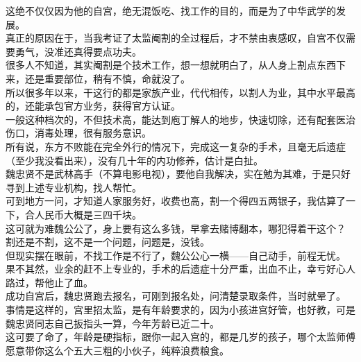 \begin{multicols}{\theparacolNo}
这绝不仅仅因为他的自宫，绝无混饭吃、找工作的目的，而是为了中华武学的发展。\\

真正的原因在于，当我考证了太监阉割的全过程后，才不禁由衷感叹，自宫不仅需要勇气，没准还真得要点功夫。\\

很多人不知道，其实阉割是个技术工作，想一想就明白了，从人身上割点东西下来，还是重要部位，稍有不慎，命就没了。\\

所以很多年以来，干这行的都是家族产业，代代相传，以割人为业，其中水平最高的，还能承包官方业务，获得官方认证。\\

一般这种档次的，不但技术高，能达到庖丁解人的地步，快速切除，还有配套医治伤口，消毒处理，很有服务意识。\\

所有说，东方不败能在完全外行的情况下，完成这一复杂的手术，且毫无后遗症（至少我没看出来），没有几十年的内功修养，估计是白扯。\\

魏忠贤不是武林高手（不算电影电视），要他自我解决，实在勉为其难，于是只好寻到上述专业机构，找人帮忙。\\

可到地方一问，才知道人家服务好，收费也高，割一个得四五两银子，我估算了一下，合人民币大概是三四千块。\\

这可就为难魏公公了，身上要有这么多钱，早拿去赌博翻本，哪犯得着干这个？\\

割还是不割，这不是一个问题，问题是，没钱。\\

但现实摆在眼前，不找工作是不行了，魏公公心一横——自己动手，前程无忧。\\

果不其然，业余的赶不上专业的，手术的后遗症十分严重，出血不止，幸亏好心人路过，帮他止了血。\\

成功自宫后，魏忠贤跑去报名，可刚到报名处，问清楚录取条件，当时就晕了。\\

事情是这样的，宫里招太监，是有年龄要求的，因为小孩进宫好管，也好教，可是魏忠贤同志自己扳指头一算，今年芳龄已近二十。\\

这可要了命了，年龄是硬指标，跟你一起入宫的，都是几岁的孩子，哪个太监师傅愿意带你这么个五大三粗的小伙子，纯粹浪费粮食。\\


\end{multicols}
